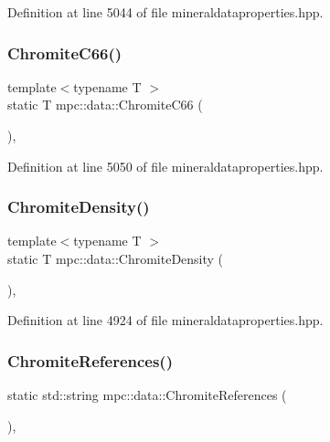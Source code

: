 Definition at line 5044 of file mineraldataproperties.\+hpp.

\mbox{\label{namespacempc_1_1data_a27f6c33b6f27e916d1dba354e1bc9313}} 
\subsubsection{\texorpdfstring{Chromite\+C66()}{ChromiteC66()}}
{\footnotesize\ttfamily template$<$typename T $>$ \\
static T mpc\+::data\+::\+Chromite\+C66 (\begin{DoxyParamCaption}{ }\end{DoxyParamCaption})\hspace{0.3cm}{\ttfamily [inline]}, {\ttfamily [static]}}



Definition at line 5050 of file mineraldataproperties.\+hpp.

\mbox{\label{namespacempc_1_1data_a1a2609b6dd3748bba9ab4d11d72e12a0}} 
\subsubsection{\texorpdfstring{Chromite\+Density()}{ChromiteDensity()}}
{\footnotesize\ttfamily template$<$typename T $>$ \\
static T mpc\+::data\+::\+Chromite\+Density (\begin{DoxyParamCaption}{ }\end{DoxyParamCaption})\hspace{0.3cm}{\ttfamily [inline]}, {\ttfamily [static]}}



Definition at line 4924 of file mineraldataproperties.\+hpp.

\mbox{\label{namespacempc_1_1data_a8ea68f6ebec0caf66845e442548f74aa}} 
\subsubsection{\texorpdfstring{Chromite\+References()}{ChromiteReferences()}}
{\footnotesize\ttfamily static std\+::string mpc\+::data\+::\+Chromite\+References (\begin{DoxyParamCaption}{ }\end{DoxyParamCaption})\hspace{0.3cm}{\ttfamily [inline]}, {\ttfamily [static]}}



